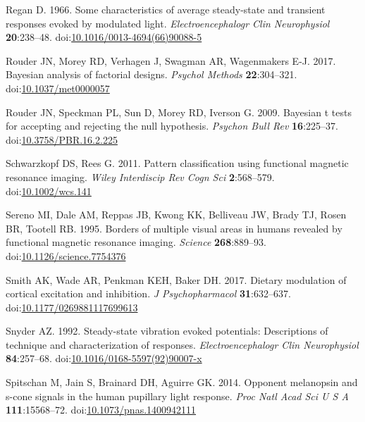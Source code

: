 \documentclass[]{article}
\begin{document}
\leavevmode\hypertarget{ref-Regan1966}{}%
Regan D. 1966. Some characteristics of average steady-state and transient responses evoked by modulated light. \emph{Electroencephalogr Clin Neurophysiol} \textbf{20}:238--48. doi:\href{https://doi.org/10.1016/0013-4694(66)90088-5}{10.1016/0013-4694(66)90088-5}

\leavevmode\hypertarget{ref-Rouder2017}{}%
Rouder JN, Morey RD, Verhagen J, Swagman AR, Wagenmakers E-J. 2017. Bayesian analysis of factorial designs. \emph{Psychol Methods} \textbf{22}:304--321. doi:\href{https://doi.org/10.1037/met0000057}{10.1037/met0000057}

\leavevmode\hypertarget{ref-Rouder2009}{}%
Rouder JN, Speckman PL, Sun D, Morey RD, Iverson G. 2009. Bayesian t tests for accepting and rejecting the null hypothesis. \emph{Psychon Bull Rev} \textbf{16}:225--37. doi:\href{https://doi.org/10.3758/PBR.16.2.225}{10.3758/PBR.16.2.225}

\leavevmode\hypertarget{ref-Schwarzkopf2011}{}%
Schwarzkopf DS, Rees G. 2011. Pattern classification using functional magnetic resonance imaging. \emph{Wiley Interdiscip Rev Cogn Sci} \textbf{2}:568--579. doi:\href{https://doi.org/10.1002/wcs.141}{10.1002/wcs.141}

\leavevmode\hypertarget{ref-Sereno1995}{}%
Sereno MI, Dale AM, Reppas JB, Kwong KK, Belliveau JW, Brady TJ, Rosen BR, Tootell RB. 1995. Borders of multiple visual areas in humans revealed by functional magnetic resonance imaging. \emph{Science} \textbf{268}:889--93. doi:\href{https://doi.org/10.1126/science.7754376}{10.1126/science.7754376}

\leavevmode\hypertarget{ref-Smith2017}{}%
Smith AK, Wade AR, Penkman KEH, Baker DH. 2017. Dietary modulation of cortical excitation and inhibition. \emph{J Psychopharmacol} \textbf{31}:632--637. doi:\href{https://doi.org/10.1177/0269881117699613}{10.1177/0269881117699613}

\leavevmode\hypertarget{ref-Snyder1992}{}%
Snyder AZ. 1992. Steady-state vibration evoked potentials: Descriptions of technique and characterization of responses. \emph{Electroencephalogr Clin Neurophysiol} \textbf{84}:257--68. doi:\href{https://doi.org/10.1016/0168-5597(92)90007-x}{10.1016/0168-5597(92)90007-x}

\leavevmode\hypertarget{ref-Spitschan2014}{}%
Spitschan M, Jain S, Brainard DH, Aguirre GK. 2014. Opponent melanopsin and s-cone signals in the human pupillary light response. \emph{Proc Natl Acad Sci U S A} \textbf{111}:15568--72. doi:\href{https://doi.org/10.1073/pnas.1400942111}{10.1073/pnas.1400942111}
\end{document}
